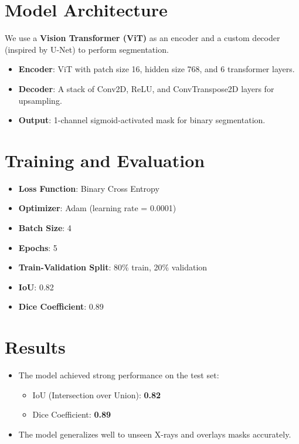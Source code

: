 \documentclass[12pt]{article}
\begin{document}
\section{Model Architecture}
We use a \textbf{Vision Transformer (ViT)} as an encoder and a custom decoder (inspired by U-Net) to perform segmentation.
\begin{itemize}
  \item \textbf{Encoder}: ViT with patch size 16, hidden size 768, and 6 transformer layers.
  \item \textbf{Decoder}: A stack of Conv2D, ReLU, and ConvTranspose2D layers for upsampling.
  \item \textbf{Output}: 1-channel sigmoid-activated mask for binary segmentation.
\end{itemize}

\section{Training and Evaluation}
\begin{itemize}
  \item \textbf{Loss Function}: Binary Cross Entropy
  \item \textbf{Optimizer}: Adam (learning rate = 0.0001)
  \item \textbf{Batch Size}: 4
  \item \textbf{Epochs}: 5
  \item \textbf{Train-Validation Split}: 80\% train, 20\% validation
  \item \textbf{IoU}: 0.82
  \item \textbf{Dice Coefficient}: 0.89
\end{itemize}

\section{Results}
\begin{itemize}
  \item The model achieved strong performance on the test set:
  \begin{itemize}
    \item IoU (Intersection over Union): \textbf{0.82}
    \item Dice Coefficient: \textbf{0.89}
  \end{itemize}
  \item The model generalizes well to unseen X-rays and overlays masks accurately.
\end{itemize}
\end{document}
